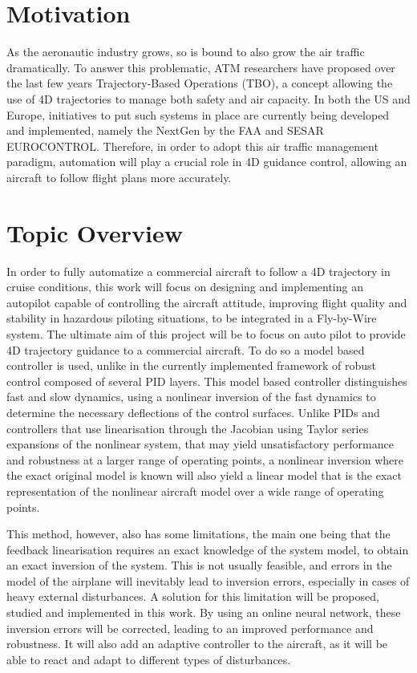 \section{Motivation}
\label{section:motivation}

As the aeronautic industry grows, so is bound to also grow the air traffic dramatically. To answer this problematic, ATM researchers have proposed over the last few years Trajectory-Based Operations (TBO), a concept allowing the use of 4D trajectories to manage both safety and air capacity. In both the US and Europe, initiatives to put such systems in place are currently being developed and implemented, namely the NextGen by the FAA and SESAR EUROCONTROL. Therefore, in order to adopt this air traffic management paradigm, automation will play a crucial role in 4D guidance control, allowing an aircraft to follow flight plans more accurately.

\section{Topic Overview}
\label{section:overview}

In order to fully automatize a commercial aircraft to follow a 4D trajectory in cruise conditions, this work will focus on designing and implementing an autopilot capable of controlling the aircraft attitude, improving flight quality and stability in hazardous piloting situations, to be integrated in a Fly-by-Wire system. The ultimate aim of this project will be to focus on auto pilot to provide 4D trajectory guidance to a commercial aircraft. To do so a model based controller is used, unlike in the currently implemented framework of robust control composed of several PID layers. This model based controller distinguishes fast and slow dynamics, using a nonlinear inversion of the fast dynamics to determine the necessary deflections of the control surfaces. Unlike PIDs and controllers that use linearisation through the Jacobian using Taylor series expansions of the nonlinear system, that may yield unsatisfactory performance and robustness at a larger range of operating points, a nonlinear inversion where the exact original model is known will also yield a linear model that is the exact representation of the nonlinear aircraft model over a wide range of operating points. 

This method, however, also has some limitations, the main one being that the feedback linearisation requires an exact knowledge of the system model, to obtain an exact inversion of the system. This is not usually feasible, and errors in the model of the airplane will inevitably lead to inversion errors, especially in cases of heavy external disturbances. A solution for this limitation will be proposed, studied and implemented in this work. By using an online neural network, these inversion errors will be corrected, leading to an improved performance and robustness. It will also add an adaptive controller to the aircraft, as it will be able to react and adapt to different types of disturbances.

